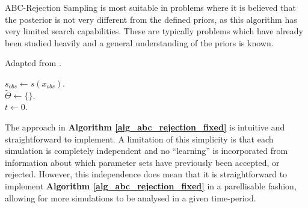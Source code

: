 \documentclass[11pt,a4paper]{article}
\theoremstyle{break}
\begin{document}
  \par ABC-Rejection Sampling is most suitable in problems where it is believed that the posterior is not very different from the defined priors, as this algorithm has very limited search capabilities. These are typically problems which have already been studied heavily and a general understanding of the priors is known.

  \begin{box_algorithm}\label{alg_abc_rejection_fixed}
    Adapted from \cite[]{ABC_in_population_genetics}.
    \par
    \begin{algorithm}[H]
      $s_{obs}\leftarrow s(x_{obs})$.\\
      $\tilde\Theta\leftarrow\{\}$.\\
      $t\leftarrow0$.\\
    \end{algorithm}
  \end{box_algorithm}

  \par The approach in \textbf{Algorithm \ref{alg_abc_rejection_fixed}} is intuitive and straightforward to implement. A limitation of this simplicity is that each simulation is completely independent and no ``learning'' is incorporated from information about which parameter sets have previously been accepted, or rejected. However, this independence does mean that it is straightforward to implement \textbf{Algorithm \ref{alg_abc_rejection_fixed}} in a parellisable fashion, allowing for more simulations to be analysed in a given time-period.
\end{document}
